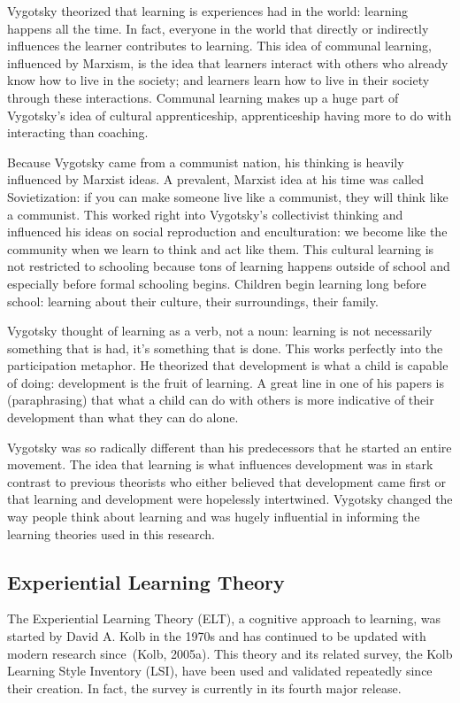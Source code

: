 Vygotsky theorized that learning is experiences had in the world: learning happens all the time. In fact, everyone in the world that directly or indirectly influences the learner contributes to learning. This idea of communal learning, influenced by Marxism, is the idea that learners interact with others who already know how to live in the society; and learners learn how to live in their society through these interactions. Communal learning makes up a huge part of Vygotsky's idea of cultural apprenticeship, apprenticeship having more to do with interacting than coaching.

Because Vygotsky came from a communist nation, his thinking is heavily influenced by Marxist ideas. A prevalent, Marxist idea at his time was called Sovietization: if you can make someone live like a communist, they will think like a communist. This worked right into Vygotsky's collectivist thinking and influenced his ideas on social reproduction and enculturation: we become like the community when we learn to think and act like them. This cultural learning is not restricted to schooling because tons of learning happens outside of school and especially before formal schooling begins. Children begin learning long before school: learning about their culture, their surroundings, their family.

Vygotsky thought of learning as a verb, not a noun: learning is not necessarily something that is had, it's something that is done. This works perfectly into the participation metaphor. He theorized that development is what a child is capable of doing: development is the fruit of learning. A great line in one of his papers is (paraphrasing) that what a child can do with others is more indicative of their development than what they can do alone.

Vygotsky was so radically different than his predecessors that he started an entire movement. The idea that learning is what influences development was in stark contrast to previous theorists who either believed that development came first or that learning and development were hopelessly intertwined. Vygotsky changed the way people think about learning and was hugely influential in informing the learning theories used in this research.

\subsection{Experiential Learning Theory}
The Experiential Learning Theory (ELT), a cognitive approach to learning, was started by David A. Kolb in the 1970s and has continued to be updated with modern research since~(Kolb, 2005a). This theory and its related survey, the Kolb Learning Style Inventory (LSI), have been used and validated repeatedly since their creation. In fact, the survey is currently in its fourth major release.

